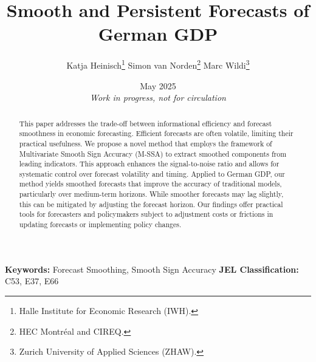 \documentclass[11pt,a4paper]{article}
\begin{document}
\setlength{\abovedisplayskip}{2cm}
\setlength{\abovedisplayshortskip}{2cm}
\setlength{\belowdisplayskip}{0cm}
\setlength{\belowdisplayshortskip}{2cm} %




\title{Smooth and Persistent Forecasts of German GDP}
\author{Katja Heinisch\thanks{Halle Institute for Economic Research (IWH).} \hspace{0.2cm}
Simon van Norden\thanks{HEC Montréal and CIREQ.} \hspace{0.2cm}
Marc Wildi\thanks{Zurich University of Applied Sciences (ZHAW).}}
\date{May 2025 \\
\vspace{2cm} \textit{Work in progress, not for circulation}}



\maketitle
\maketitle

\begin{abstract} %
This paper addresses the trade-off between informational efficiency and forecast smoothness in economic forecasting. Efficient forecasts are often volatile, limiting their practical usefulness. We propose a novel method that employs the framework of Multivariate Smooth Sign Accuracy (M-SSA) to extract smoothed components from leading indicators. This approach enhances the signal-to-noise ratio and allows for systematic control over forecast volatility and timing. Applied to German GDP, our method yields smoothed forecasts that improve the accuracy of traditional models, particularly over medium-term horizons. While smoother forecasts may lag slightly, this can be mitigated by adjusting the forecast horizon. Our findings offer practical tools for forecasters and policymakers subject to adjustment costs or frictions in updating forecasts or implementing policy changes.

\end{abstract}

\bigskip \vspace{10pt}
\textbf{Keywords:} Forecast Smoothing, Smooth Sign Accuracy 
\newline
\textbf{JEL Classification:} C53, E37, E66
\thispagestyle{empty}
\end{document}
